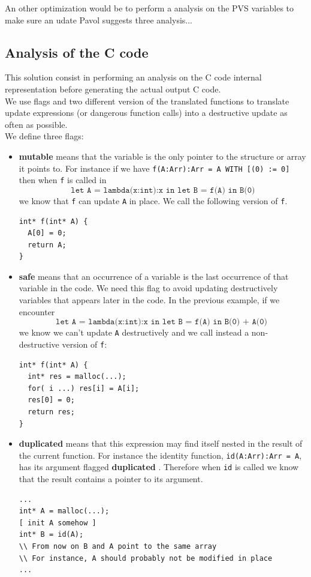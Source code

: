\documentclass[12pt,a4paper,titlepage]{article}
\newcommand{\cl}[1]{\texttt{#1}}
\newcommand{\bang}{ \textbf{ mutable } }
\newcommand{\safe}{ \textbf{ safe } }
\newcommand{\dupl}{ \textbf{ duplicated } }
\begin{document}
An other optimization would be to perform a analysis on the PVS variables to make sure an udate
Pavol \cite{pavol} suggests three analysis...



\subsection{Analysis of the C code}
\label{Canalysis}

This solution consist in performing an analysis on the C code internal representation before generating the actual output C code.\\

We use flags and two different version of the translated functions to translate update expressions (or dangerous function calls) into a destructive update as often as possible.\\


We define three flags:
\begin{itemize}
\item \bang means that the variable is the only pointer to the structure or array it points to. For instance if we have \cl{f(A:Arr):Arr = A WITH [(0) := 0]} then when \cl{f} is called in
$$ \cl{let A = lambda(x:int):x in let B = f(A) in B(0)} $$
we know that \cl{f} can update \cl{A} in place. We call the following version of \cl{f}.
\begin{lstlisting}
int* f(int* A) {
  A[0] = 0;
  return A;
}
\end{lstlisting}

\item \safe means that an occurrence of a variable is the last occurrence of that variable in the code. We need this flag to avoid updating destructively variables that appears later in the code. In the previous example, if we encounter
$$ \cl{let A = lambda(x:int):x in let B = f(A) in B(0) + A(0) }$$
we know we can't update \cl{A} destructively and we call instead a non-destructive version of \cl{f}:
\begin{lstlisting}
int* f(int* A) {
  int* res = malloc(...);
  for( i ...) res[i] = A[i];
  res[0] = 0;
  return res;
}
\end{lstlisting}

\item \dupl means that this expression may find itself nested in the result of the current function. For instance the identity function, \cl{id(A:Arr):Arr = A}, has its argument flagged \dupl. Therefore when \cl{id} is called we know that the result contains a pointer to its argument.
\begin{lstlisting}
...
int* A = malloc(...);
[ init A somehow ]
int* B = id(A);
\\ From now on B and A point to the same array
\\ For instance, A should probably not be modified in place
...
\end{lstlisting}
\end{itemize}
\end{document}
